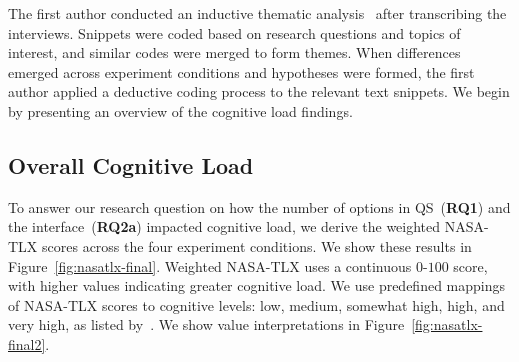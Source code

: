 The first author conducted an inductive thematic analysis~\cite{olsonWaysKnowingHCI2014} after transcribing the interviews. Snippets were coded based on research questions and topics of interest, and similar codes were merged to form themes. When differences emerged across experiment conditions and hypotheses were formed, the first author applied a deductive coding process to the relevant text snippets. We begin by presenting an overview of the cognitive load findings. 

\subsection{Overall Cognitive Load}
\label{sec:cog}

To answer our research question on how the number of options in QS~(\textbf{RQ1}) and the interface~(\textbf{RQ2a}) impacted cognitive load, we derive the weighted NASA-TLX scores across the four experiment conditions. We show these results in Figure~\ref{fig:nasatlx-final}. Weighted NASA-TLX uses a continuous $0$-$100$ score, with higher values indicating greater cognitive load. We use predefined mappings of NASA-TLX scores to cognitive levels: low, medium, somewhat high, high, and very high, as listed by~\textcite{hart1988development}. We show value interpretations in Figure~\ref{fig:nasatlx-final2}. 



